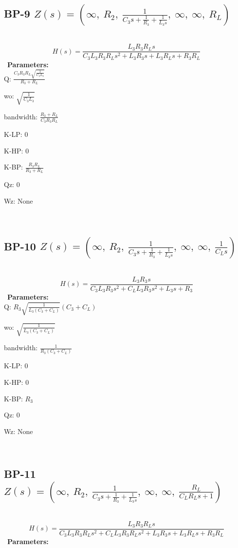 \documentclass{article}
\begin{document}
\subsection{BP-9 $Z(s) = \left( \infty, \  R_{2}, \  \frac{1}{C_{3} s + \frac{1}{R_{3}} + \frac{1}{L_{3} s}}, \  \infty, \  \infty, \  R_{L}\right)$ } \ 
\textbf{\[H(s) = \frac{L_{3} R_{3} R_{L} s}{C_{3} L_{3} R_{3} R_{L} s^{2} + L_{3} R_{3} s + L_{3} R_{L} s + R_{3} R_{L}}\] } \ 
\textbf{Parameters:}\\ 

Q: $\frac{C_{3} R_{3} R_{L} \sqrt{\frac{1}{C_{3} L_{3}}}}{R_{3} + R_{L}}$\ 

wo: $\sqrt{\frac{1}{C_{3} L_{3}}}$\ 

bandwidth: $\frac{R_{3} + R_{L}}{C_{3} R_{3} R_{L}}$\ 

K-LP: $0$\ 

K-HP: $0$\ 

K-BP: $\frac{R_{3} R_{L}}{R_{3} + R_{L}}$\ 

Qz: $0$\ 

Wz: $\text{None}$\ 

\ 

\subsection{BP-10 $Z(s) = \left( \infty, \  R_{2}, \  \frac{1}{C_{3} s + \frac{1}{R_{3}} + \frac{1}{L_{3} s}}, \  \infty, \  \infty, \  \frac{1}{C_{L} s}\right)$ } \ 
\textbf{\[H(s) = \frac{L_{3} R_{3} s}{C_{3} L_{3} R_{3} s^{2} + C_{L} L_{3} R_{3} s^{2} + L_{3} s + R_{3}}\] } \ 
\textbf{Parameters:}\\ 

Q: $R_{3} \sqrt{\frac{1}{L_{3} \left(C_{3} + C_{L}\right)}} \left(C_{3} + C_{L}\right)$\ 

wo: $\sqrt{\frac{1}{L_{3} \left(C_{3} + C_{L}\right)}}$\ 

bandwidth: $\frac{1}{R_{3} \left(C_{3} + C_{L}\right)}$\ 

K-LP: $0$\ 

K-HP: $0$\ 

K-BP: $R_{3}$\ 

Qz: $0$\ 

Wz: $\text{None}$\ 

\ 

\subsection{BP-11 $Z(s) = \left( \infty, \  R_{2}, \  \frac{1}{C_{3} s + \frac{1}{R_{3}} + \frac{1}{L_{3} s}}, \  \infty, \  \infty, \  \frac{R_{L}}{C_{L} R_{L} s + 1}\right)$ } \ 
\textbf{\[H(s) = \frac{L_{3} R_{3} R_{L} s}{C_{3} L_{3} R_{3} R_{L} s^{2} + C_{L} L_{3} R_{3} R_{L} s^{2} + L_{3} R_{3} s + L_{3} R_{L} s + R_{3} R_{L}}\] } \ 
\textbf{Parameters:}\\ 
\end{document}
